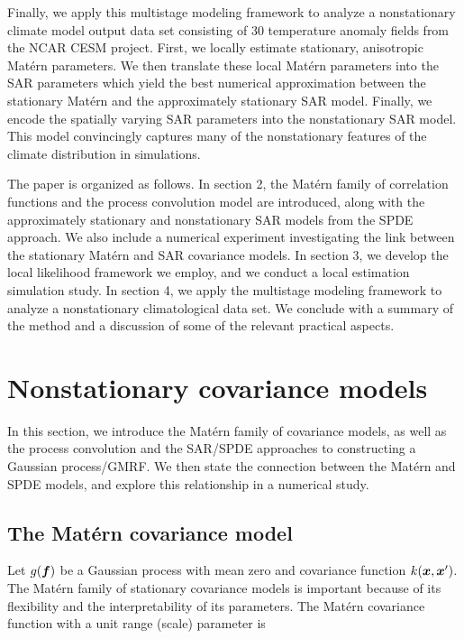 \documentclass[review]{elsarticle}
\begin{document}
Finally, we apply this multistage modeling framework to analyze a nonstationary climate model output data set consisting of 30 temperature anomaly fields from the NCAR CESM project. First, we locally estimate stationary, anisotropic Mat\'ern parameters. We then translate these local Mat\'ern parameters into the SAR parameters which yield the best numerical approximation between the stationary Mat\'ern and the approximately stationary SAR model. Finally, we encode the spatially varying SAR parameters into the nonstationary SAR model. This model convincingly captures many of the nonstationary features of the climate distribution in simulations. 


The paper is organized as follows. In section 2, the Mat\'ern family of correlation functions and the process convolution model are introduced, along with the approximately stationary and nonstationary SAR models from the SPDE approach. We also include a numerical experiment investigating the link between the stationary Mat\'ern and SAR covariance models. In section 3, we develop the local likelihood framework we employ, and we conduct a local estimation simulation study.  In section 4, we apply the multistage modeling framework to analyze a nonstationary climatological data set. We conclude with a summary of the method and a discussion of some of the relevant practical aspects.














\section{Nonstationary covariance models}

 In this section, we introduce the Mat\'ern family of covariance models, as well as the process convolution and the SAR/SPDE approaches to constructing a Gaussian process/GMRF. We then state the connection between the Mat\'ern and SPDE models, and explore this relationship in a numerical study.


\subsection{The Mat\'ern covariance model}

Let $g(\mbox{\boldmath $f$})$ be a Gaussian process with mean zero and covariance function  $k( \mbox{\boldmath $x$}, \mbox{\boldmath $x$}^\prime)$.
The Mat\'ern family of stationary covariance models is important because of its flexibility and the interpretability of its parameters. The  Mat\'ern covariance function with a unit range (scale) parameter is
\end{document}
